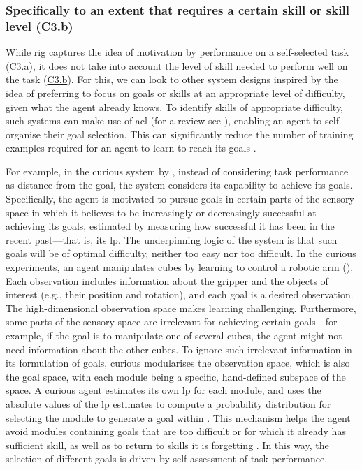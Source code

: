 \documentclass[10pt,letterpaper]{article}
\begin{document}
\subsubsection{Specifically to an extent that requires a certain skill or skill level (C3.b)}
 \label{sec:c3b}

While \gls{rig} captures the idea of motivation by performance on a self-selected task (\hyperref[sec:c3a]{C3.a}), it does not take into account the level of skill needed to perform well on the task (\hyperref[sec:c3b]{C3.b}). For this, we can look to other system designs inspired by the idea of preferring to focus on goals or skills at an appropriate level of difficulty, given what the agent already knows. To identify skills of appropriate difficulty, such systems can make use of \gls{acl} (for a review see \citealp{portelas2021automatic}), enabling an agent to self-organise their goal selection. This can significantly reduce the number of training examples required for an agent to learn to reach its goals \citep[p.~1]{florensa18automatic}.

For example, in the \gls{curious} system by \citet{colas2019curious}, instead of considering task performance as distance from the goal, the system considers its capability to achieve its goals. Specifically, the agent is motivated to pursue goals in certain parts of the sensory space in which it believes to be increasingly or decreasingly successful at achieving its goals, estimated by measuring how successful it has been in the recent past---that is, its \gls{lp}. The underpinning logic of the system is that such goals will be of optimal difficulty, neither too easy nor too difficult. In the \gls{curious} experiments, an agent manipulates cubes by learning to control a robotic arm (\citealp[Supplementary p.~3]{colas2019curious}). Each observation includes information about the gripper and the objects of interest (e.g., their position and rotation), and each goal is a desired observation. The high-dimensional observation space makes learning challenging. Furthermore, some parts of the sensory space are irrelevant for achieving certain goals---for example, if the goal is to manipulate one of several cubes, the agent might not need information about the other cubes. To ignore such irrelevant information in its formulation of goals, \gls{curious} modularises the observation space, which is also the goal space, with each module being a specific, hand-defined subspace of the space. A \gls{curious} agent estimates its own \gls{lp} for each module, and uses the absolute values of the \gls{lp} estimates to compute a probability distribution for selecting the module to generate a goal within \citep[p.~4]{colas2019curious}. This mechanism helps the agent avoid modules containing goals that are too difficult or for which it already has sufficient skill, as well as to return to skills it is forgetting \citep[pp.~2--3]{colas2019curious}. In this way, the selection of different goals is driven by self-assessment of task performance.
\end{document}
